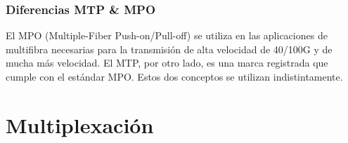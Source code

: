 \subsubsection*{Diferencias MTP \& MPO}
El MPO (Multiple-Fiber Push-on/Pull-off) se utiliza en las aplicaciones de multifibra necesarias para la transmisión de alta velocidad de 40/100G y de mucha más velocidad. El MTP, por otro lado, es una marca registrada que cumple con el estándar MPO. Estos dos conceptos se utilizan indistintamente.

\section{Multiplexación}



